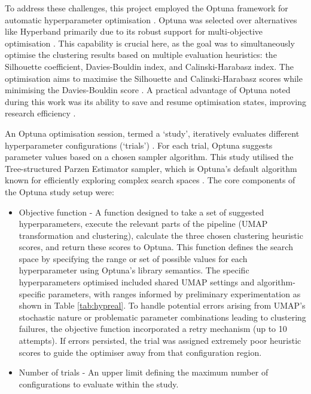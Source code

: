 \documentclass[10pt,oneside]{report}
\begin{document}
To address these challenges, this project employed the Optuna framework for automatic hyperparameter optimisation \cite{akiba2019optuna}. Optuna was selected over alternatives like Hyperband \cite{li2018hyperband} primarily due to its robust support for multi-objective optimisation \cite{akiba2019optuna}. This capability is crucial here, as the goal was to simultaneously optimise the clustering results based on multiple evaluation heuristics: the Silhouette coefficient, Davies-Bouldin index, and Calinski-Harabasz index. The optimisation aims to maximise the Silhouette and Calinski-Harabasz scores while minimising the Davies-Bouldin score \cite{rousseeuw1987silhouettes, davies1979cluster, calinski1974dendrite}. A practical advantage of Optuna noted during this work was its ability to save and resume optimisation states, improving research efficiency \cite{akiba2019optuna}.   

An Optuna optimisation session, termed a `study', iteratively evaluates different hyperparameter configurations (`trials') \cite{akiba2019optuna}. For each trial, Optuna suggests parameter values based on a chosen sampler algorithm. This study utilised the Tree-structured Parzen Estimator sampler, which is Optuna's default algorithm known for efficiently exploring complex search spaces \cite{watanabe2023tree}. The core components of the Optuna study setup were:   

\begin{itemize}
    \item Objective function - A function designed to take a set of suggested hyperparameters, execute the relevant parts of the pipeline (UMAP transformation and clustering), calculate the three chosen clustering heuristic scores, and return these scores to Optuna. This function defines the search space by specifying the range or set of possible values for each hyperparameter using Optuna's library semantics. The specific hyperparameters optimised included shared UMAP settings and algorithm-specific parameters, with ranges informed by preliminary experimentation as shown in Table \ref{tab:hypreal}. To handle potential errors arising from UMAP's stochastic nature or problematic parameter combinations leading to clustering failures, the objective function incorporated a retry mechanism (up to 10 attempts). If errors persisted, the trial was assigned extremely poor heuristic scores to guide the optimiser away from that configuration region.
    \item Number of trials - An upper limit defining the maximum number of configurations to evaluate within the study.
\end{itemize}
\end{document}
